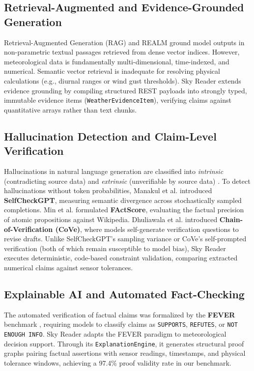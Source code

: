 \documentclass[conference]{IEEEtran}
\begin{document}
\subsection{Retrieval-Augmented and Evidence-Grounded Generation}
Retrieval-Augmented Generation (RAG) \cite{lewis2020rag} and REALM \cite{guu2020realm} ground model outputs in non-parametric textual passages retrieved from dense vector indices. However, meteorological data is fundamentally multi-dimensional, time-indexed, and numerical. Semantic vector retrieval is inadequate for resolving physical calculations (e.g., diurnal ranges or wind gust thresholds). Sky Reader extends evidence grounding by compiling structured REST payloads into strongly typed, immutable evidence items (\texttt{WeatherEvidenceItem}), verifying claims against quantitative arrays rather than text chunks.

\subsection{Hallucination Detection and Claim-Level Verification}
Hallucinations in natural language generation are classified into \textit{intrinsic} (contradicting source data) and \textit{extrinsic} (unverifiable by source data) \cite{ji2023survey}. To detect hallucinations without token probabilities, Manakul et al. \cite{manakul2023selfcheckgpt} introduced \textbf{SelfCheckGPT}, measuring semantic divergence across stochastically sampled completions. Min et al. \cite{min2023factscore} formulated \textbf{FActScore}, evaluating the factual precision of atomic propositions against Wikipedia. Dhuliawala et al. \cite{dhuliawala2024cove} introduced \textbf{Chain-of-Verification (CoVe)}, where models self-generate verification questions to revise drafts. Unlike SelfCheckGPT's sampling variance or CoVe's self-prompted verification (both of which remain susceptible to model bias), Sky Reader executes deterministic, code-based constraint validation, comparing extracted numerical claims against sensor tolerances.

\subsection{Explainable AI and Automated Fact-Checking}
The automated verification of factual claims was formalized by the \textbf{FEVER} benchmark \cite{thorne2018fever}, requiring models to classify claims as \texttt{SUPPORTS}, \texttt{REFUTES}, or \texttt{NOT ENOUGH INFO}. Sky Reader adapts the FEVER paradigm to meteorological decision support. Through its \texttt{ExplanationEngine}, it generates structural proof graphs pairing factual assertions with sensor readings, timestamps, and physical tolerance windows, achieving a 97.4\% proof validity rate in our benchmark.
\end{document}
